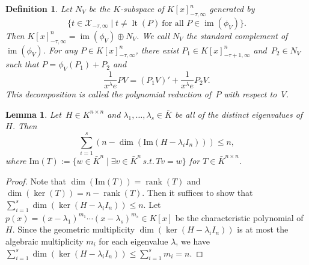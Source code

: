 \documentclass[final,1p,times,authoryear]{elsarticle}
\newtheorem{lemma}[theorem]{Lemma}
\newtheorem{defi}[theorem]{Definition}
\newcommand{\cX}{ {\mathcal X}}
\def\rank{\operatorname{rank}}
\def\lt{\operatorname{lt}}
\def\im{\operatorname{im}}
\begin{document}
\begin{defi}
  Let $N_V$ be the $K$-subspace of $K[x]_{-\tau,\infty}^n$ generated by
\[
  \bigl\{t \in \cX_{-\tau,\infty} \mathrel{|} t \neq \lt(P) \ \text{for all $P\in \im(\phi_V)$}\bigr\}.
\]
Then $K[x]_{-\tau,\infty}^n = \im(\phi_V) \oplus N_V$.
We call $N_V$ the \emph{standard complement} of $\im(\phi_V)$.
For any $P\in K[x]_{-\tau,\infty}^n$, there exist $P_1\in K[x]_{-\tau+1,\infty}^n$ and~$P_2\in N_V$
such that $P=\phi_V(P_1)+P_2$ and
\[
  \frac{1}{x^\lambda e}PV = (P_1V)' + \frac{1}{x^\lambda e}P_2V.
\]
This decomposition is called the \emph{polynomial reduction} of~$P$
with respect to~$V$.
\end{defi}

\begin{lemma}\label{LM:eigen}
Let~$H\in K^{n\times n}$ and $\lambda_1, \ldots, \lambda_s \in \bar{K}$ be all of the distinct eigenvalues of $H$.
Then
\[\sum_{i=1}^s (n-\dim(\text{Im}(H-\lambda_iI_n)))\leq n,\]
where $\text{Im}(T) := \{w\in \bar{K}^n\mid \exists v\in \bar{K}^n\, s.t.\, Tv=w \}$ for $T\in \bar{K}^{n\times n}$.
\end{lemma}
\begin{proof}
Note that $\dim(\text{Im}(T))= \rank(T)$ and $\dim(\ker(T))= n-\rank(T)$. Then it suffices to show that
$\sum_{i=1}^s \dim(\ker(H-\lambda_iI_n))\leq n$. Let $p(x) = (x-\lambda_1)^{m_1}\cdots (x-\lambda_s)^{m_s}\in K[x]$
be the characteristic polynomial of $H$. Since the geometric multiplicity $\dim(\ker(H-\lambda_iI_n))$ is at most the
algebraic multiplicity $m_i$ for each eigenvalue $\lambda$, we have $\sum_{i=1}^s \dim(\ker(H-\lambda_iI_n)) \leq \sum_{i=1}^s m_i = n$.
\end{proof}
\end{document}
